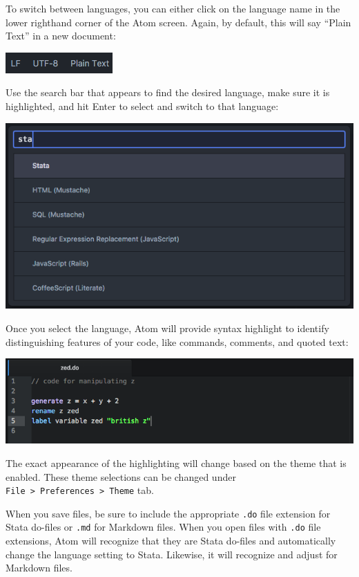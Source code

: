 \documentclass[]{book}
\begin{document}
To switch between languages, you can either click on the language name
in the lower righthand corner of the Atom screen. Again, by default,
this will say ``Plain Text'' in a new document:

\includegraphics[width=0.35\linewidth]{images/atomLanguages}

Use the search bar that appears to find the desired language, make sure
it is highlighted, and hit Enter to select and switch to that language:

\includegraphics[width=0.75\linewidth]{images/atomLangSelector}

Once you select the language, Atom will provide syntax highlight to
identify distinguishing features of your code, like commands, comments,
and quoted text:

\includegraphics[width=1\linewidth]{images/atomHighlight}

The exact appearance of the highlighting will change based on the theme
that is enabled. These theme selections can be changed under
\texttt{File\ \textgreater{}\ Preferences\ \textgreater{}\ Theme} tab.

When you save files, be sure to include the appropriate \texttt{.do}
file extension for Stata do-files or \texttt{.md} for Markdown files.
When you open files with \texttt{.do} file extensions, Atom will
recognize that they are Stata do-files and automatically change the
language setting to Stata. Likewise, it will recognize and adjust for
Markdown files.
\end{document}
